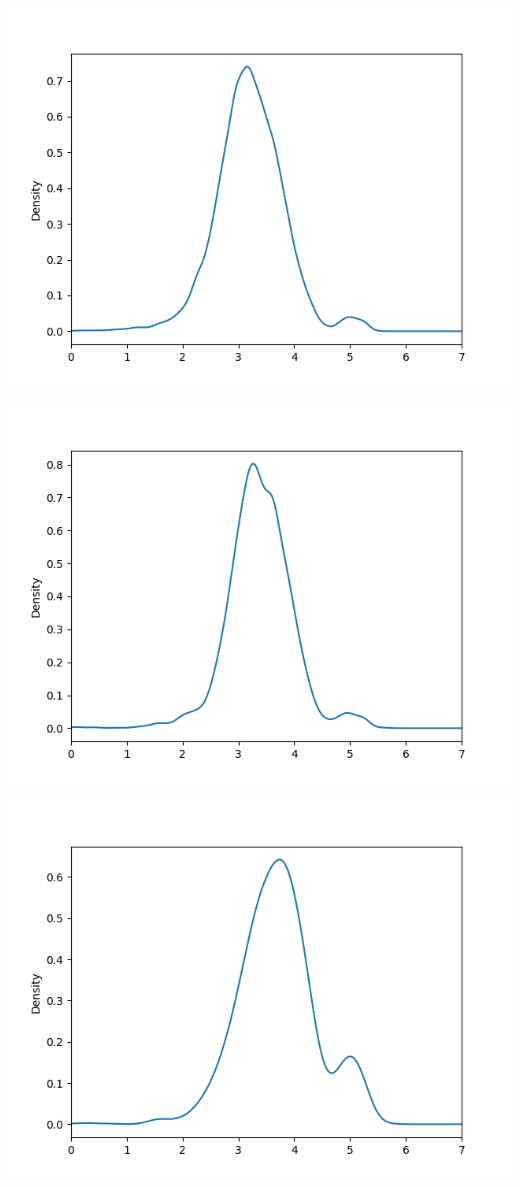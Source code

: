\documentclass{article}
\begin{document}
\begin{enumerate}[label=\alph*)]
\includegraphics[scale=.8]{part_b_16}

\includegraphics[scale=.8]{part_b_18}

\includegraphics[scale=.8]{part_b_20}


\end{enumerate}
\end{document}
